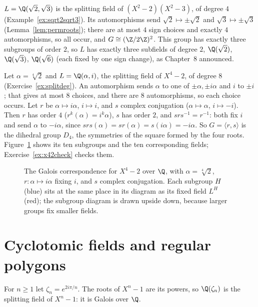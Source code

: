 \begin{example}\label{ex:galv4}
$L=\Q(\sqrt2,\sqrt3)$ is the splitting field of $(X^2-2)(X^2-3)$, of degree $4$ (Example~\ref{ex:sqrt2sqrt3}). Its automorphisms send $\sqrt2\mapsto\pm\sqrt2$ and $\sqrt3\mapsto\pm\sqrt3$ (Lemma~\ref{lem:permroots}); there are at most $4$ sign choices and exactly $4$ automorphisms, so all occur, and $G\cong(\Z/2\Z)^2$. This group has exactly three subgroups of order $2$, so $L$ has exactly three subfields of degree $2$, $\Q(\sqrt2)$, $\Q(\sqrt3)$, $\Q(\sqrt6)$ (each fixed by one sign change), as Chapter~8 announced.
\end{example}

\begin{example}\label{ex:galx42}
Let $\alpha=\sqrt[4]2$ and $L=\Q(\alpha,i)$, the splitting field of $X^4-2$, of degree $8$ (Exercise~\ref{ex:splitdeg}). An automorphism sends $\alpha$ to one of $\pm\alpha,\pm i\alpha$ and $i$ to $\pm i$; that gives at most $8$ choices, and there are $8$ automorphisms, so each choice occurs. Let $r$ be $\alpha\mapsto i\alpha$, $i\mapsto i$, and $s$ complex conjugation ($\alpha\mapsto\alpha$, $i\mapsto-i$). Then $r$ has order $4$ ($r^k(\alpha)=i^k\alpha$), $s$ has order $2$, and $srs^{-1}=r^{-1}$: both fix $i$ and send $\alpha$ to $-i\alpha$, since $srs(\alpha)=sr(\alpha)=s(i\alpha)=-i\alpha$. So $G=\langle r,s\rangle$ is the dihedral group $D_4$, the symmetries of the square formed by the four roots. Figure~\ref{fig:galoislattice} shows its ten subgroups and the ten corresponding fields; Exercise~\ref{ex:x42check} checks them.
\end{example}

\begin{figure}[ht]
\centering
{}
\caption{The Galois correspondence for $X^4-2$ over $\Q$, with $\alpha=\sqrt[4]2$, $r:\alpha\mapsto i\alpha$ fixing $i$, and $s$ complex conjugation. Each subgroup $H$ (blue) sits at the same place in its diagram as its fixed field $L^H$ (red); the subgroup diagram is drawn upside down, because larger groups fix smaller fields.}
\label{fig:galoislattice}
\end{figure}

\section{Cyclotomic fields and regular polygons}

For $n\ge1$ let $\zeta_n=e^{2i\pi/n}$. The roots of $X^n-1$ are its powers, so $\Q(\zeta_n)$ is the splitting field of $X^n-1$: it is Galois over $\Q$.

